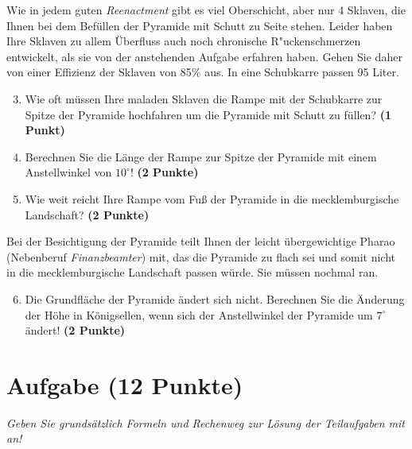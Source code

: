 \documentclass[a4paper, 9pt]{scrartcl}\usepackage[]{graphicx}\usepackage[]{xcolor}
\begin{document}
Wie in jedem guten \textit{Reenactment} gibt es viel Oberschicht, aber nur
4 Sklaven, die Ihnen bei dem Bef{\"u}llen der Pyramide mit Schutt
zu Seite stehen. Leider haben Ihre Sklaven zu allem {\"U}berfluss auch noch
chronische R{"u}ckenschmerzen entwickelt, als sie von der
anstehenden Aufgabe erfahren haben. Gehen Sie daher von einer Effizienz der
Sklaven von 85\% aus. In eine Schubkarre passen
95 Liter.

\begin{enumerate}
  \setcounter{enumi}{2}
\item Wie oft m{\"u}ssen Ihre maladen Sklaven die Rampe mit der Schubkarre
  zur Spitze der Pyramide hochfahren um die Pyramide mit Schutt zu f{\"u}llen? \textbf{(1 Punkt)}
\item Berechnen Sie die L{\"a}nge der Rampe zur Spitze der Pyramide mit einem
  Anstellwinkel von $10^\circ$! \textbf{(2 Punkte)}
\item Wie weit reicht Ihre Rampe vom Fu{\ss} der Pyramide in die mecklemburgische
  Landschaft?  \textbf{(2 Punkte)}
\end{enumerate}

Bei der Besichtigung der Pyramide teilt Ihnen der leicht {\"u}bergewichtige
Pharao (Nebenberuf \textit{Finanzbeamter}) mit, das die Pyramide zu
flach sei und somit nicht in die mecklemburgische Landschaft passen
w{\"u}rde. Sie m{\"u}ssen nochmal ran.

\begin{enumerate}
  \setcounter{enumi}{5}
\item Die Grundfl{\"a}che der Pyramide {\"a}ndert sich nicht. Berechnen Sie die
  {\"A}nderung der H{\"o}he in K{\"o}nigsellen, wenn sich der Anstellwinkel der
  Pyramide um $7^\circ$ {\"a}ndert!  \textbf{(2 Punkte)}
\end{enumerate}



\clearpage

\section{Aufgabe \hfill (12 Punkte)}

\textit{Geben Sie grunds{\"a}tzlich Formeln und Rechenweg zur L{\"o}sung der
  Teilaufgaben mit an!} \\[1Ex]
\end{document}
